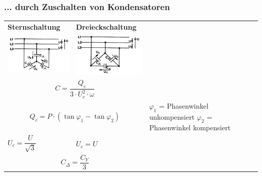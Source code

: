 		\subsubsection{... durch Zuschalten von Kondensatoren}
			\begin{tabular}{p{5cm} | p{5cm} p{6cm}}
				\textbf{Sternschaltung} &
				\textbf{Dreieckschaltung} \\
				\parbox[b][2.5cm][t]{5cm}{\includegraphics[width=4cm]{bilder/Leistungsfaktorverbesserung_Zuschalten_Kondensator_Stern.png}}
								&
				\parbox[b][2.5cm][t]{5cm}{\includegraphics[width=4cm]{bilder/Leistungsfaktorverbesserung_Zuschalten_Kondensator_Dreieck.png}}\\
				\\
				 &
				\parbox{6cm}{
					$\varphi_1$ = Phasenwinkel unkompensiert\\
					$\varphi_2$ = Phasenwinkel kompensiert 
				} \\
				$U_c = \dfrac{U}{\sqrt{3}}$&
				$U_c = U$\\
				
			\end{tabular}
